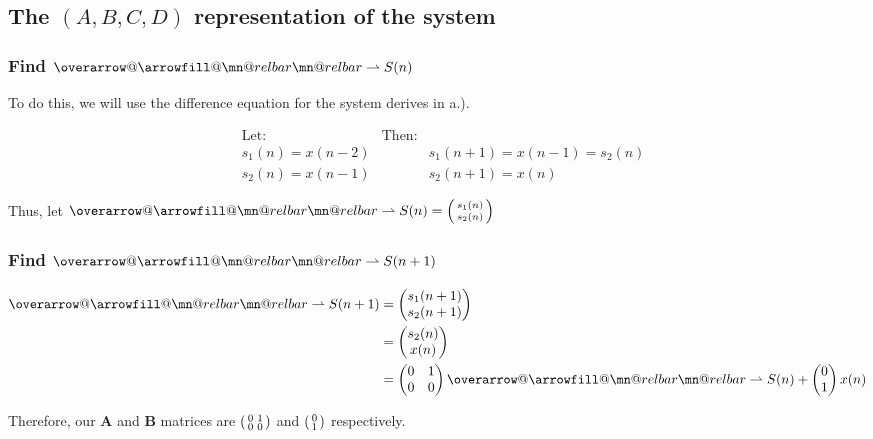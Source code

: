 \documentclass{article}
\makeatletter
\renewcommand{\thesubsection}{\thesection.\alph{subsection}}
\renewcommand{\thesubsubsection}{\thesection.\alph{subsection}.\Roman{subsubsection}}
\DeclareRobustCommand{\overrightharpoon}{\mathpalette{\overarrow@\rightharpoonfill@}}
\def\rightharpoonfill@{\arrowfill@\mn@relbar\mn@relbar\rightharpoonup}
\makeatother
\begin{document}
\subsection[~\thesubsection]{The $(A, B, C, D)$ representation of the system}

\subsubsection[~\thesubsubsection]{Find $\overrightharpoon{S(n)}$}

To do this, we will use the difference equation for the system derives in a.).

\begin{align*}
	&\text{Let:}& \text{Then:} \\
	&s_1(n) = x(n - 2)& &s_1(n + 1) = x(n - 1) = s_2(n) \\
	&s_2(n) = x(n - 1)& &s_2(n + 1) = x(n)
\end{align*}

Thus, let $\overrightharpoon{S(n)} = \begin{psmallmatrix} s_1(n) \\ s_2(n) \end{psmallmatrix}$

\subsubsection[~\thesubsubsection]{Find $\overrightharpoon{S(n + 1)}$}

\begin{align*}
	\overrightharpoon{S(n + 1)} &= \begin{pmatrix} s_1(n + 1) \\ s_2(n + 1) \end{pmatrix} \\
	&= \begin{pmatrix} s_2(n) \\ x(n) \end{pmatrix} \\
	&= \begin{pmatrix} 0 & 1 \\ 0 & 0 \end{pmatrix}\overrightharpoon{S(n)} + \begin{pmatrix} 0 \\ 1 \end{pmatrix}x(n)
\end{align*}

Therefore, our $\boldsymbol{A}$ and $\boldsymbol{B}$ matrices are $\begin{psmallmatrix} 0 & 1 \\ 0 & 0 \end{psmallmatrix}$ and $\begin{psmallmatrix} 0 \\ 1 \end{psmallmatrix}$ respectively.
\end{document}
